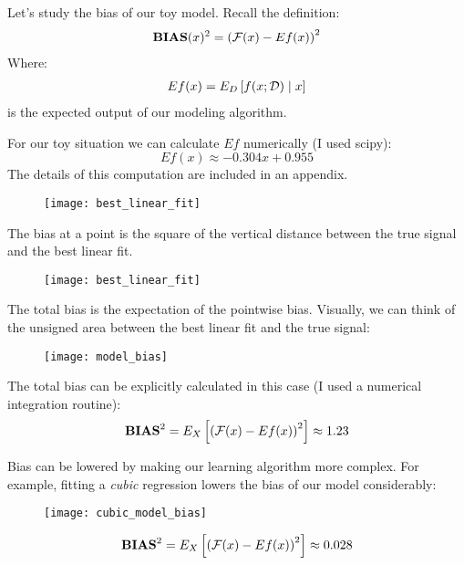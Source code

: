 %
%
\begin{frame}
  Let's study the bias of our toy model.  Recall the definition:
  \begin{align*}
    \operatorname*{\mathbf{BIAS}} (x)^2 = \left( \operatorname*{\mathcal{F}}(x) - Ef(x) \right)^2
  \end{align*}
  Where:
  \begin{align*}
    Ef(x) = E_D \left[ f(x; \operatorname*{\mathcal{D}}) \mid x \right] \\ 
  \end{align*}
  is the expected output of our modeling algorithm.
\end{frame}
%
%
\begin{frame}
  For our toy situation we can calculate $Ef$ numerically (I used scipy):
  $$ Ef(x) \approx -0.304 x +  0.955 $$
  The details of this computation are included in an appendix.
\end{frame}
%
%
\begin{frame}
  \begin{figure}
    \texttt{[image: best\_linear\_fit]}
  \end{figure}
\end{frame}
%
%
\begin{frame}
  The bias at a point is the square of the vertical distance between the true
  signal and the best linear fit.
  \begin{figure}
    \texttt{[image: best\_linear\_fit]}
  \end{figure}
\end{frame}
%
%
\begin{frame}
  The total bias is the expectation of the pointwise bias.  Visually, we can
  think of the unsigned area between the best linear fit and the true signal:
  \begin{figure}
    \texttt{[image: model\_bias]}
  \end{figure}
\end{frame}
%
%
\begin{frame}
  The total bias can be explicitly calculated in this case (I used a numerical
  integration routine):
  $$ {\operatorname*{\mathbf{BIAS}}}^2 = E_X \left[ \left( \operatorname*{\mathcal{F}}(x) - Ef(x) \right)^2 \right] \approx 1.23
  $$
\end{frame}
%
%
\begin{frame}
  Bias can be lowered by making our learning algorithm more complex.  For
  example, fitting a \textit{cubic} regression lowers the bias of our model
  considerably:
  \begin{figure}
    \texttt{[image: cubic\_model\_bias]}
  \end{figure}
  $$ {\operatorname*{\mathbf{BIAS}}}^2 = E_X \left[ \left( \operatorname*{\mathcal{F}}(x) - Ef(x) \right)^2 \right] \approx 0.028
  $$
\end{frame}
